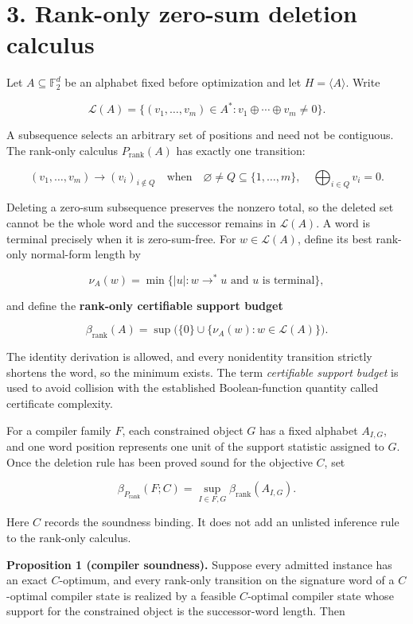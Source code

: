 \documentclass[11pt]{article}
\begin{document}
\hypertarget{rank-only-zero-sum-deletion-calculus}{%
\section*{3. Rank-only zero-sum deletion calculus}\label{rank-only-zero-sum-deletion-calculus}}

Let \(A\subseteq\mathbb{F}_2^d\) be an alphabet fixed before optimization and let \(H=\langle A\rangle\). Write

\[
\mathcal{L}(A)=\{(v_1,\ldots,v_m)\in A^*:v_1\oplus\cdots\oplus v_m\neq 0\}.
\]

A subsequence selects an arbitrary set of positions and need not be contiguous. The rank-only calculus \(P_{\mathrm{rank}}(A)\) has exactly one transition:

\[
(v_1,\ldots,v_m)
\longrightarrow
(v_i)_{i\notin Q}
\quad\text{when}\quad
\varnothing\neq Q\subseteq\{1,\ldots,m\},
\quad
\bigoplus_{i\in Q}v_i=0.
\]

Deleting a zero-sum subsequence preserves the nonzero total, so the deleted set cannot be the whole word and the successor remains in \(\mathcal{L}(A)\). A word is terminal precisely when it is zero-sum-free. For \(w\in\mathcal{L}(A)\), define its best rank-only normal-form length by

\[
\nu_A(w)=
\min\{|u|:w\longrightarrow^*u\text{ and }u\text{ is terminal}\},
\]

and define the \textbf{rank-only certifiable support budget}

\[
\beta_{\mathrm{rank}}(A)
=
\sup\bigl(\{0\}\cup\{\nu_A(w):w\in\mathcal{L}(A)\}\bigr).
\]

The identity derivation is allowed, and every nonidentity transition strictly shortens the word, so the minimum exists. The term \emph{certifiable support budget} is used to avoid collision with the established Boolean-function quantity called certificate complexity.

For a compiler family \(F\), each constrained object \(G\) has a fixed alphabet \(A_{I,G}\), and one word position represents one unit of the support statistic assigned to \(G\). Once the deletion rule has been proved sound for the objective \(C\), set

\[
\beta_{P_{\mathrm{rank}}}(F;C)
=
\sup_{I\in F,G}\beta_{\mathrm{rank}}(A_{I,G}).
\]

Here \(C\) records the soundness binding. It does not add an unlisted inference rule to the rank-only calculus.

\textbf{Proposition 1 (compiler soundness).} Suppose every admitted instance has an exact \(C\)-optimum, and every rank-only transition on the signature word of a \(C\)-optimal compiler state is realized by a feasible \(C\)-optimal compiler state whose support for the constrained object is the successor-word length. Then
\end{document}
